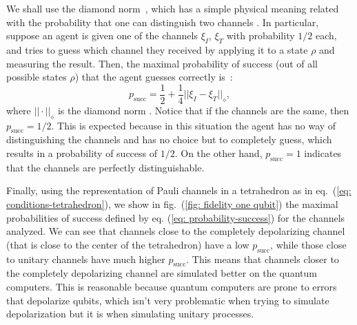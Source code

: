 \documentclass[10pt,letterpaper]{article} %
\renewcommand{\succ}{\textrm{succ}}
\begin{document}
We shall use the diamond norm~\cite{Aharonov,Wilde}, which has a simple physical meaning related
with the probability that one can distinguish two channels .
In particular, suppose an agent is given one of the channels $\xi_I$, $\xi_T$
with probability $1/2$ each,
and tries to guess which channel they received
by applying it to a state $\rho$ and measuring the result.
Then, the maximal probability of success (out of all possible states $\rho$) that
the agent guesses correctly is~\cite{Benenti}:
\begin{equation}
\label{eq: probability-success}
p_{\succ} = \dfrac{1}{2}+ \dfrac{1}{4} ||\xi_I - \xi_T ||_{\diamond},
\end{equation}
where $|| \cdot ||_{\diamond}$ is the diamond norm .  
Notice that if the channels are the same, then $p_{\succ}=1/2$. 
This is expected because in this situation the agent
has no way of distinguishing the channels and has no choice but to completely
guess, which results in a probability of success of $1/2$.
On the other hand, $p_{\succ}=1$ indicates that the channels are perfectly
distinguishable.

Finally, using the representation of Pauli channels in a tetrahedron as
in eq.~(\ref{eq: conditions-tetrahedron}),
we show in fig.~(\ref{fig: fidelity one qubit}) the maximal probabilities of
success defined by eq. (\ref{eq: probability-success}) for the channels
analyzed. 
We can see that channels close to the 
completely depolarizing
channel (that is close to the center of the tetrahedron)
have a low $p_{\succ}$, while those 
close to unitary channels have much higher $p_{\succ}$.
This means that channels closer to the 
completely depolarizing channel are simulated better on the quantum computers.
This is reasonable because quantum computers are prone to errors
that depolarize qubits, which isn't very problematic
when trying to simulate depolarization but it is 
when simulating unitary processes.
\end{document}
